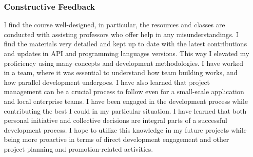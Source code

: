 \documentclass[12pt,a4paper]{article}
\begin{document}
\subsubsection{Constructive Feedback}
I find the course well-designed, in particular, the resources and classes are conducted with assisting professors who offer help in any misunderstandings. I find the materials very detailed and kept up to date with the latest contributions and updates in API and programming languages versions. This way I elevated my proficiency using many concepts and development methodologies. I have worked in a team, where it was essential to understand how team building works, and how parallel development undergoes. I have also learned that project management can be a crucial process to follow even for a small-scale application and local enterprise teams. I have been engaged in the development process while contributing the best I could in my particular situation. I have learned that both personal initiative and collective decisions are integral parts of a successful development process. I hope to utilize this knowledge in my future projects while being more proactive in terms of direct development engagement and other project planning and promotion-related activities.

\end{document}

